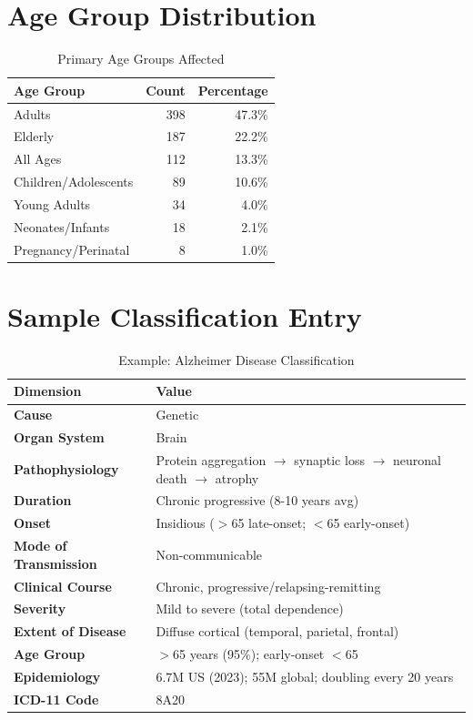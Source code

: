 \section{Age Group Distribution}
\label{sec:age_distribution}

\begin{table}[htbp]
\centering
\caption{Primary Age Groups Affected}
\label{tab:age_dist}
\begin{tabular}{lrr}
\toprule
\textbf{Age Group} & \textbf{Count} & \textbf{Percentage} \\
\midrule
Adults & 398 & 47.3\% \\
Elderly & 187 & 22.2\% \\
All Ages & 112 & 13.3\% \\
Children/Adolescents & 89 & 10.6\% \\
Young Adults & 34 & 4.0\% \\
Neonates/Infants & 18 & 2.1\% \\
Pregnancy/Perinatal & 8 & 1.0\% \\
\bottomrule
\end{tabular}
\end{table}

\section{Sample Classification Entry}
\label{sec:sample_entry}

\begin{table}[htbp]
\centering
\caption{Example: Alzheimer Disease Classification}
\label{tab:alzheimer_example}
\begin{tabular}{>{\bfseries}ll}
\toprule
\textbf{Dimension} & \textbf{Value} \\
\midrule
Cause & Genetic \\
Organ System & Brain \\
Pathophysiology & Protein aggregation $\to$ synaptic loss $\to$ neuronal death $\to$ atrophy \\
Duration & Chronic progressive (8-10 years avg) \\
Onset & Insidious ($>$65 late-onset; $<$65 early-onset) \\
Mode of Transmission & Non-communicable \\
Clinical Course & Chronic, progressive/relapsing-remitting \\
Severity & Mild to severe (total dependence) \\
Extent of Disease & Diffuse cortical (temporal, parietal, frontal) \\
Age Group & $>$65 years (95\%); early-onset $<$65 \\
Epidemiology & 6.7M US (2023); 55M global; doubling every 20 years \\
ICD-11 Code & 8A20 \\
\bottomrule
\end{tabular}
\end{table}

